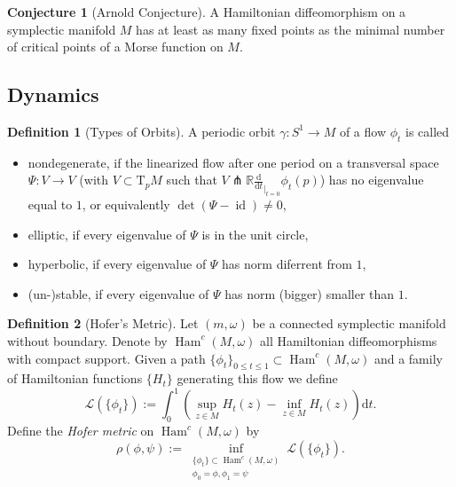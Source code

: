 \documentclass[a4paper]{article}
\newcommand{\RR}{\mathbb{R}}
\newcommand{\mcL}{\mathcal L}
\newcommand{\dd}{\mathrm{d}}
\newcommand{\lra}{\longrightarrow}
\newcommand{\ddt}{\frac{\dd}{\dd t}_{|_{t=0}}}
\newcommand{\id}{\operatorname{id}}
\newcommand{\ts}{\mathrm{T}}
\newcommand{\Ham}{\operatorname{Ham}}
\theoremstyle{definition}
\newtheorem{conjecture}{Conjecture}
\theoremstyle{definition}
\newtheorem{definition}{Definition}
\theoremstyle{remark}
\theoremstyle{remark}
\begin{document}
\begin{conjecture}[Arnold Conjecture]
  A Hamiltonian diffeomorphism on a symplectic manifold $M$ has at least as many fixed points as the minimal number of critical points of a Morse function on $M$.
\end{conjecture}

\subsection{Dynamics}

\begin{definition}[Types of Orbits]
A periodic orbit $\gamma:S^1\lra M$ of a flow $\phi_t$ is called
\begin{itemize}
  \item nondegenerate, if the linearized flow after one period on a transversal space $\Psi:V\lra V$ (with $V\subset \ts_p M$ such that $V\pitchfork \RR\ddt\phi_t(p)$) has no eigenvalue equal to $1$, or equivalently $\det(\Psi-\id)\neq 0$,
  \item elliptic, if every eigenvalue of $\Psi$ is in the unit circle,
  \item hyperbolic, if every eigenvalue of $\Psi$ has norm diferrent from $1$,
  \item (un-)stable, if every eigenvalue of $\Psi$ has norm (bigger) smaller than $1$.
\end{itemize}
\end{definition}

\begin{definition}[Hofer's Metric]
  Let $(m,\omega)$ be a connected symplectic manifold without boundary. Denote by $\Ham^c(M,\omega)$ all Hamiltonian diffeomorphisms with compact support. Given a path $\{\phi_t\}_{0\leq t\leq 1}\subset\Ham^c(M,\omega)$ and a family of Hamiltonian functions $\{H_t\}$ generating this flow we define
  \begin{equation*}
    \mcL(\{\phi_t\}):=\int_0^1\left(\sup_{z\in M}H_t(z)-\inf_{z\in M} H_t(z)\right)\dd t.
  \end{equation*}
  Define the \emph{Hofer metric} on $\Ham^c(M,\omega)$ by
  \begin{equation*}
    \rho(\phi,\psi):=\inf_{\substack{\{\phi_t\}\subset\Ham^c(M,\omega)\\ \phi_0=\phi, \phi_1=\psi}}\mcL(\{\phi_t\}).
  \end{equation*}
\end{definition}



{}

\end{document}
